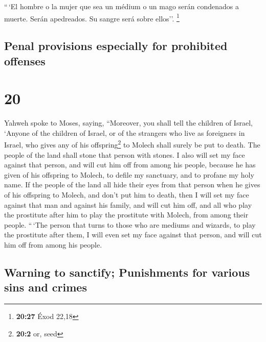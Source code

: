 \begin{paracol}{2}
 ``\,`El hombre o la mujer que sea un médium o un mago
serán condenados a muerte. Serán apedreados. Su sangre será sobre
ellos''. \footnote{\textbf{20:27} Éxod 22,18}

\switchcolumn
\begin{otherlanguage}{english}

\hypertarget{penal-provisions-especially-for-prohibited-offenses}{%
\subsection{Penal provisions especially for prohibited
offenses}\label{penal-provisions-especially-for-prohibited-offenses}}

\hypertarget{section-39}{%
\section{20}\label{section-39}}

 Yahweh spoke to Moses, saying,  ``Moreover,
you shall tell the children of Israel, `Anyone of the children of
Israel, or of the strangers who live as foreigners in Israel, who gives
any of his offspring\footnote{\textbf{20:2} or, seed} to Molech shall
surely be put to death. The people of the land shall stone that person
with stones.  I also will set my face against that person,
and will cut him off from among his people, because he has given of his
offspring to Molech, to defile my sanctuary, and to profane my holy
name.  If the people of the land all hide their eyes from
that person when he gives of his offspring to Molech, and don't put him
to death,  then I will set my face against that man and
against his family, and will cut him off, and all who play the
prostitute after him to play the prostitute with Molech, from among
their people.  ``\,`The person that turns to those who are
mediums and wizards, to play the prostitute after them, I will even set
my face against that person, and will cut him off from among his people.

\hypertarget{warning-to-sanctify-punishments-for-various-sins-and-crimes}{%
\subsection{Warning to sanctify; Punishments for various sins and
crimes}\label{warning-to-sanctify-punishments-for-various-sins-and-crimes}}


\end{otherlanguage}
\end{paracol}
